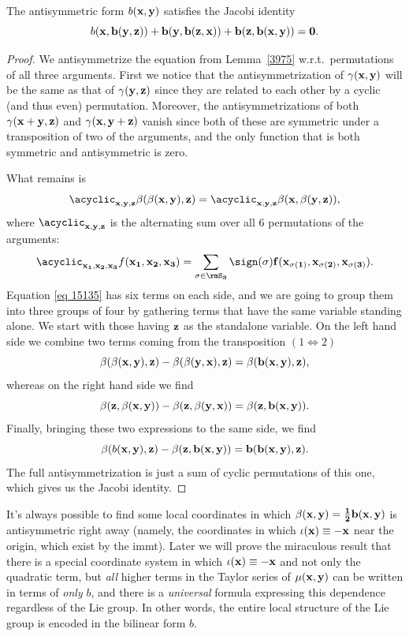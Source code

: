 \begin{lem}
    The antisymmetric form $b(\bf{x},\bf{y})$ satisfies the Jacobi identity
    \[b(\bf{x},b(\bf{y},\bf{z}))+b(\bf{y},b(\bf{z},\bf{x}))+b(\bf{z},b(\bf{x},\bf{y}))=0.\]
\end{lem}
\begin{proof}
    We antisymmetrize the equation from Lemma~\ref{3975} w.r.t.\ permutations of all three arguments. First we notice that the antisymmetrization of $\gamma(\bf{x},\bf{y})$ will be the same as that of $\gamma(\bf{y},\bf{z})$ since they are related to each other by a cyclic (and thus even) permutation. Moreover, the antisymmetrizations of both $\gamma(\bf{x}+\bf{y},\bf{z})$ and $\gamma(\bf{x},\bf{y}+\bf{z})$ vanish since both of these are symmetric under a transposition of two of the arguments, and the only function that is both symmetric and antisymmetric is zero.

    What remains is 
    \[\acyclic_{\bf x,\bf y,\bf z} \beta(\beta(\bf{x},\bf{y}),\bf{z})=\acyclic_{\bf x,\bf y,\bf z} \beta(\bf{x},\beta(\bf{y},\bf{z})),\label{eq 15135}\]
    where $\acyclic_{\bf x,\bf y,\bf z}$ is the alternating sum over all $6$ permutations of the arguments:
    \[\acyclic_{\bf x_1,\bf x_2,\bf x_3} f(\bf{x}_1,\bf{x}_2,\bf{x}_3)=\sum_{\sigma\in \rmS_3}\sign(\sigma)f(\bf{x}_{\sigma(1)},\bf{x}_{\sigma(2)},\bf{x}_{\sigma(3)}).\]
    Equation \eqref{eq 15135} has six terms on each side, and we are going to group them into three groups of four by gathering terms that have the same variable standing alone. We start with those having $\bf{z}$ as the standalone variable. On the left hand side we combine two terms coming from the transposition $(1\Leftrightarrow2)$
    \[\beta(\beta(\bf{x},\bf{y}),\bf{z})-\beta(\beta(\bf{y},\bf{x}),\bf{z})=\beta(b(\bf{x},\bf{y}),\bf{z}),\]
    whereas on the right hand side we find
    \[\beta(\bf{z},\beta(\bf{x},\bf{y}))-\beta(\bf{z},\beta(\bf{y},\bf{x}))=\beta(\bf{z},b(\bf{x},\bf{y})).\]
    Finally, bringing these two expressions to the same side, we find
    \[\beta(b(\bf{x},\bf{y}),\bf{z})-\beta(\bf{z},b(\bf{x},\bf{y}))=b(b(\bf{x},\bf{y}),\bf{z}).\]
    The full antisymmetrization is just a sum of cyclic permutations of this one, which gives us the Jacobi identity.
\end{proof}

\begin{rem}
    It's always possible to find some local coordinates in which $\beta(\bf{x},\bf{y})=\frac12 b(\bf{x},\bf{y})$ is antisymmetric right away (namely, the coordinates in which $\iota(\bf{x})\equiv -\bf{x}$ near the origin, which exist by the \gls{immt}). Later we will prove the miraculous result that there is a special coordinate system in which $\iota(\bf{x})\equiv-\bf{x}$ and not only the quadratic term, but \emph{all} higher terms in the Taylor series of $\mu(\bf{x},\bf{y})$ can be written in terms of \emph{only} $b$, and there is a \emph{universal} formula expressing this dependence regardless of the Lie group. In other words, the entire local structure of the Lie group is encoded in the bilinear form $b$.
\end{rem}



